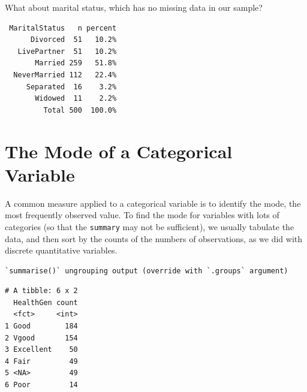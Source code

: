 \documentclass[
]{book}
\newenvironment{Shaded}{\begin{snugshade}}{\end{snugshade}}
\newcommand{\DataTypeTok}[1]{\textcolor[rgb]{0.13,0.29,0.53}{#1}}
\newcommand{\KeywordTok}[1]{\textcolor[rgb]{0.13,0.29,0.53}{\textbf{#1}}}
\newcommand{\NormalTok}[1]{#1}
\newcommand{\OperatorTok}[1]{\textcolor[rgb]{0.81,0.36,0.00}{\textbf{#1}}}
\newcommand{\StringTok}[1]{\textcolor[rgb]{0.31,0.60,0.02}{#1}}
\begin{document}
What about marital status, which has no missing data in our sample?

\begin{Shaded}
\end{Shaded}

\begin{verbatim}
 MaritalStatus   n percent
      Divorced  51   10.2%
   LivePartner  51   10.2%
       Married 259   51.8%
  NeverMarried 112   22.4%
     Separated  16    3.2%
       Widowed  11    2.2%
         Total 500  100.0%
\end{verbatim}

\hypertarget{the-mode-of-a-categorical-variable}{%
\section{The Mode of a Categorical Variable}\label{the-mode-of-a-categorical-variable}}

A common measure applied to a categorical variable is to identify the mode, the most frequently observed value. To find the mode for variables with lots of categories (so that the \texttt{summary} may not be sufficient), we usually tabulate the data, and then sort by the counts of the numbers of observations, as we did with discrete quantitative variables.

\begin{Shaded}
\end{Shaded}

\begin{verbatim}
`summarise()` ungrouping output (override with `.groups` argument)
\end{verbatim}

\begin{verbatim}
# A tibble: 6 x 2
  HealthGen count
  <fct>     <int>
1 Good        184
2 Vgood       154
3 Excellent    50
4 Fair         49
5 <NA>         49
6 Poor         14
\end{verbatim}
\end{document}
